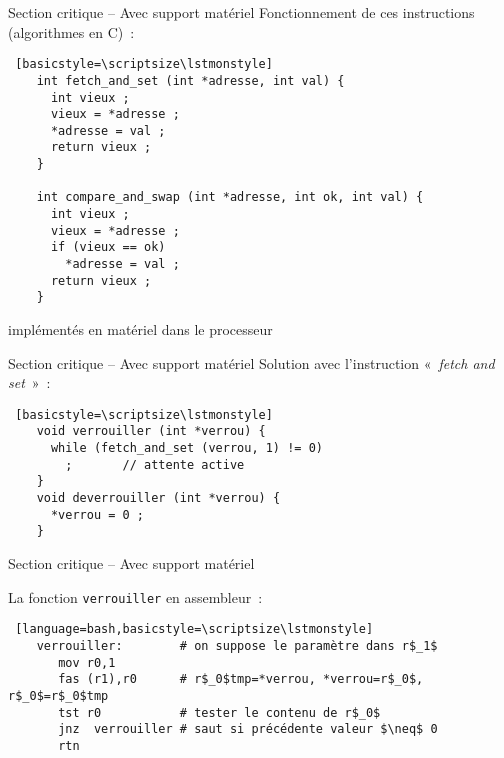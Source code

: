\begin {frame} [fragile] {Section critique -- Avec support matériel}
    Fonctionnement de ces instructions (algorithmes en C)~:

    \begin {lstlisting} [basicstyle=\scriptsize\lstmonstyle]
    int fetch_and_set (int *adresse, int val) {
      int vieux ;
      vieux = *adresse ;
      *adresse = val ;
      return vieux ;
    }

    int compare_and_swap (int *adresse, int ok, int val) {
      int vieux ;
      vieux = *adresse ;
      if (vieux == ok)
        *adresse = val ;
      return vieux ;
    }
    \end{lstlisting}

    \implique implémentés en matériel dans le processeur

\end{frame}


\begin {frame} [fragile] {Section critique -- Avec support matériel}
    Solution avec l'instruction «~\emph {fetch and set}~»~:

    \begin {lstlisting} [basicstyle=\scriptsize\lstmonstyle]
    void verrouiller (int *verrou) {
      while (fetch_and_set (verrou, 1) != 0)
        ;       // attente active
    }
    void deverrouiller (int *verrou) {
      *verrou = 0 ;
    }
    \end{lstlisting}

\end{frame}

\begin {frame} [fragile] {Section critique -- Avec support matériel}

    La fonction \texttt {verrouiller} en assembleur~:

    \begin {lstlisting} [language=bash,basicstyle=\scriptsize\lstmonstyle]
    verrouiller:        # on suppose le paramètre dans r$_1$
       mov r0,1
       fas (r1),r0      # r$_0$tmp=*verrou, *verrou=r$_0$, r$_0$=r$_0$tmp
       tst r0           # tester le contenu de r$_0$
       jnz  verrouiller # saut si précédente valeur $\neq$ 0
       rtn
    \end{lstlisting}

\end{frame}

